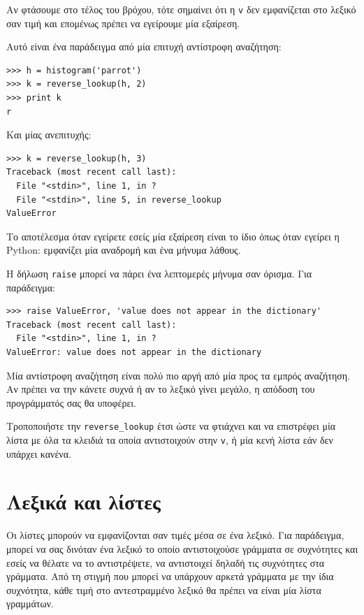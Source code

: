 \documentclass[10pt]{book}
\begin{document}
Αν φτάσουμε στο τέλος του βρόχου, τότε σημαίνει ότι η {\tt v} δεν εμφανίζεται στο λεξικό σαν τιμή και επομένως πρέπει να εγείρουμε μία εξαίρεση.

Αυτό είναι ένα παράδειγμα από μία επιτυχή αντίστροφη αναζήτηση:

\begin{verbatim}
>>> h = histogram('parrot')
>>> k = reverse_lookup(h, 2)
>>> print k
r
\end{verbatim}
%
Και μίας ανεπιτυχής:

\begin{verbatim}
>>> k = reverse_lookup(h, 3)
Traceback (most recent call last):
  File "<stdin>", line 1, in ?
  File "<stdin>", line 5, in reverse_lookup
ValueError
\end{verbatim}
%
Το αποτέλεσμα όταν εγείρετε εσείς μία εξαίρεση είναι το ίδιο όπως όταν εγείρει η Python: εμφανίζει μία αναδρομή και ένα μήνυμα λάθους.

Η δήλωση {\tt raise} μπορεί να πάρει ένα λεπτομερές μήνυμα σαν όρισμα. Για παράδειγμα:

\begin{verbatim}
>>> raise ValueError, 'value does not appear in the dictionary'
Traceback (most recent call last):
  File "<stdin>", line 1, in ?
ValueError: value does not appear in the dictionary
\end{verbatim}
%
Μία αντίστροφη αναζήτηση είναι πολύ πιο αργή από μία προς τα εμπρός αναζήτηση. Αν πρέπει να την κάνετε συχνά ή αν το λεξικό γίνει μεγάλο, η απόδοση του προγράμματός σας θα υποφέρει.
\\
\begin{exercise}

Τροποποιήστε την \verb"reverse_lookup" έτσι ώστε να φτιάχνει και να επιστρέφει μία λίστα με όλα τα κλειδιά τα οποία αντιστοιχούν στην {\tt v}, ή μία κενή λίστα εάν δεν υπάρχει κανένα.
\end{exercise}


\section{Λεξικά και λίστες}
\label{invert}

Οι λίστες μπορούν να εμφανίζονται σαν τιμές μέσα σε ένα λεξικό. Για παράδειγμα, μπορεί να σας δινόταν ένα λεξικό το οποίο αντιστοιχούσε γράμματα σε συχνότητες και εσείς να θέλατε να το αντιστρέψετε, να αντιστοιχεί δηλαδή τις συχνότητες στα γράμματα. Από τη στιγμή που μπορεί να υπάρχουν αρκετά γράμματα με την ίδια συχνότητα, κάθε τιμή στο αντεστραμμένο λεξικό θα πρέπει να είναι μία λίστα γραμμάτων.
\end{document}
